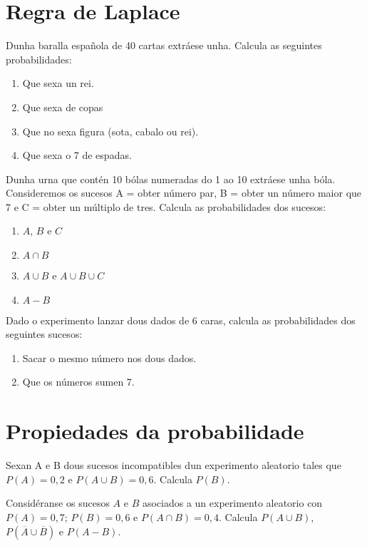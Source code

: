 \section{Regra de Laplace}

\Exercicio  Dunha baralla española de 40 cartas extráese unha. Calcula as seguintes probabilidades:

\begin{enumerate}[topsep=0pt,itemsep=0pt]
	\item Que sexa un rei.
	\item Que sexa de copas
	\item Que no sexa figura (sota, cabalo ou rei).
	\item Que sexa o 7 de espadas.
\end{enumerate}


\Exercicio Dunha urna que contén 10 bólas numeradas do 1 ao 10 extráese unha bóla. Consideremos os sucesos A = obter número par, B = obter un número maior que 7 e C = obter un múltiplo de tres. Calcula as probabilidades dos sucesos:

\begin{enumerate}[topsep=0pt,itemsep=0pt]
	\item $A$, $B$ e $C$
	\item $A \cap B$
	\item $A \cup B$ e $A \cup B \cup C$
	\item $A - B $
\end{enumerate}


\Exercicio Dado o experimento lanzar dous dados de 6 caras, calcula as probabilidades dos seguintes sucesos:

\begin{enumerate}[topsep=0pt,itemsep=0pt]
	\item Sacar o mesmo número nos dous dados.
	\item Que os números sumen 7.
\end{enumerate}


\section{Propiedades da probabilidade}

\Exercicio Sexan A e B dous sucesos incompatibles dun experimento aleatorio tales que $P(A)= 0,2$ e $P(A\cup B)=0,6$. Calcula $P(B)$.

\Exercicio Considéranse os sucesos $A$ e $B$ asociados a un experimento aleatorio con $P(A)= 0,7$; $P(B)=0,6$ e $P(A\cap B) = 0,4$. Calcula $ P(A\cup B)$, $ P(\overline{A} \cup \overline{B})$ e $ P(A - B)$.

